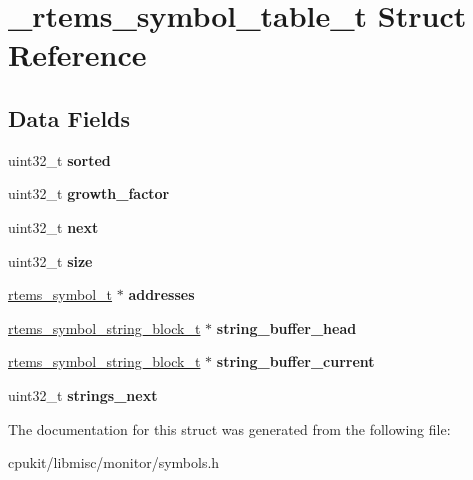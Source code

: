 \hypertarget{struct__rtems__symbol__table__t}{}\section{\+\_\+rtems\+\_\+symbol\+\_\+table\+\_\+t Struct Reference}
\label{struct__rtems__symbol__table__t}
\subsection*{Data Fields}
\begin{DoxyCompactItemize}
\item 
\mbox{\label{struct__rtems__symbol__table__t_ac10607a5745f7c2c1d4b281a98748c98}} 
uint32\+\_\+t {\bfseries sorted}
\item 
\mbox{\label{struct__rtems__symbol__table__t_a619ad66c5f11b8c4a37da0b174aa53bf}} 
uint32\+\_\+t {\bfseries growth\+\_\+factor}
\item 
\mbox{\label{struct__rtems__symbol__table__t_a7fdd2affd853692fb6d3e9e763cf9efa}} 
uint32\+\_\+t {\bfseries next}
\item 
\mbox{\label{struct__rtems__symbol__table__t_a9098bf0be874a11678e3d888c6f5230c}} 
uint32\+\_\+t {\bfseries size}
\item 
\mbox{\label{struct__rtems__symbol__table__t_a7d1977b3b90e294d7285214eec2b1d05}} 
\mbox{\hyperlink{struct__rtems__symbol__t}{rtems\+\_\+symbol\+\_\+t}} $\ast$ {\bfseries addresses}
\item 
\mbox{\label{struct__rtems__symbol__table__t_a3da7b10f1f77e6dc5fcd7070512f4829}} 
\mbox{\hyperlink{structrtems__symbol__string__block__s}{rtems\+\_\+symbol\+\_\+string\+\_\+block\+\_\+t}} $\ast$ {\bfseries string\+\_\+buffer\+\_\+head}
\item 
\mbox{\label{struct__rtems__symbol__table__t_a79297f3034a3154c178453d7d1a41553}} 
\mbox{\hyperlink{structrtems__symbol__string__block__s}{rtems\+\_\+symbol\+\_\+string\+\_\+block\+\_\+t}} $\ast$ {\bfseries string\+\_\+buffer\+\_\+current}
\item 
\mbox{\label{struct__rtems__symbol__table__t_a4142fbecfc8736786fb8ce6fc706a334}} 
uint32\+\_\+t {\bfseries strings\+\_\+next}
\end{DoxyCompactItemize}


The documentation for this struct was generated from the following file\+:\begin{DoxyCompactItemize}
\item 
cpukit/libmisc/monitor/symbols.\+h\end{DoxyCompactItemize}
